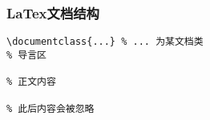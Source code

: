 \begin{frame}[fragile]
\frametitle{LaTex文档结构}

\begin{verbatim}
\documentclass{...} % ... 为某文档类
% 导言区

% 正文内容

% 此后内容会被忽略
\end{verbatim}

\end{frame}
